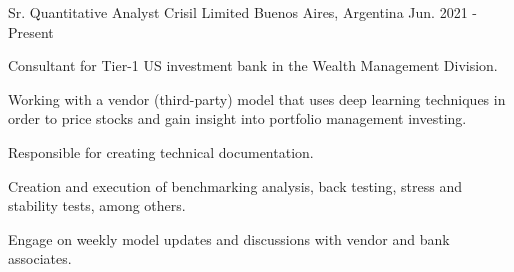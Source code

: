 

\begin{cventries}

  \cventry
    {Sr. Quantitative Analyst} %
    {Crisil Limited} %
    {Buenos Aires, Argentina} %
    {Jun. 2021 - Present} %
    {
      \begin{cvitems} %
        \item {Consultant for Tier-1 US investment bank in the Wealth Management Division.}
        \item {Working with a vendor (third-party) model that uses deep learning techniques in order to price stocks and gain insight into portfolio management investing.}
        \item {Responsible for creating technical documentation.}
        \item {Creation and execution of benchmarking analysis, back testing, stress and stability tests, among others.}
        \item {Engage on weekly model updates and discussions with vendor and bank associates.}
      \end{cvitems}
    }


\end{cventries}
